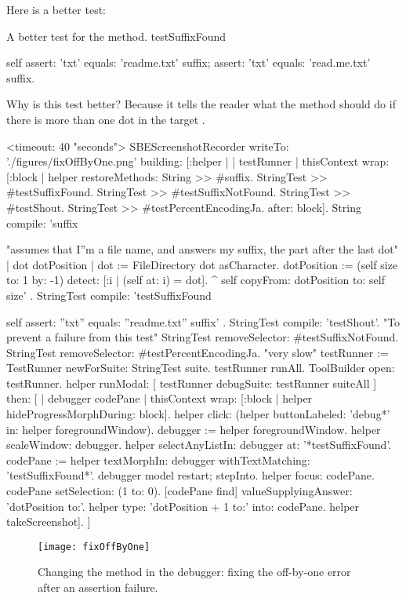 \documentclass[a4paper,10pt,twoside]{book}
\begin{document}
Here is a better test:

\begin{method}[testSuffix2]{A better test for the  method.}
testSuffixFound

	self
		assert: 'txt' equals: 'readme.txt' suffix;
		assert: 'txt' equals: 'read.me.txt' suffix.
\end{method}
\noindent
Why is this test better?
Because it tells the reader what the method should do if there is more than one dot in the target .


\begin{ExecuteSmalltalkScript}
<timeout: 40 "seconds">
SBEScreenshotRecorder writeTo: './figures/fixOffByOne.png' building: [:helper |
	| testRunner |
	thisContext wrap: [:block | helper restoreMethods: {
			String >> #suffix.
			StringTest >> #testSuffixFound.
			StringTest >> #testSuffixNotFound.
			StringTest >> #testShout.
			StringTest >> #testPercentEncodingJa. }
		after: block].
	String compile: 'suffix

"assumes that I''m a file name, and answers my suffix, the part after the last dot"
| dot dotPosition |
dot := FileDirectory dot asCharacter.
dotPosition := (self size to: 1 by: -1) detect: [:i | (self at: i) = dot].
^ self copyFrom: dotPosition to: self size'
.
	StringTest compile: 'testSuffixFound

self assert: ''txt'' equals: ''readme.txt'' suffix'
.
	StringTest compile: 'testShout'. "To prevent a failure from this test"
	StringTest removeSelector: #testSuffixNotFound.
	StringTest removeSelector: #testPercentEncodingJa. "very slow"
	testRunner := TestRunner newForSuite: StringTest suite.
	testRunner runAll.
	ToolBuilder open: testRunner.
	helper
		runModal: [ testRunner debugSuite: testRunner suiteAll ]
		then: [
			| debugger codePane |
			thisContext wrap: [:block | helper hideProgressMorphDuring: block].
			helper click: (helper buttonLabeled: 'debug*' in: helper foregroundWindow).
			debugger := helper foregroundWindow.
			helper scaleWindow: debugger.
			helper selectAnyListIn: debugger at: '*testSuffixFound'.
			codePane := helper textMorphIn: debugger withTextMatching: 'testSuffixFound*'.
			debugger model restart; stepInto.
			helper focus: codePane.
			codePane setSelection: (1 to: 0).
			[codePane find]
				valueSupplyingAnswer: 'dotPosition to:'.
			helper type: 'dotPosition + 1 to:' into: codePane.
			helper takeScreenshot].
]
\end{ExecuteSmalltalkScript}
\begin{figure}[btp]
	\begin{center}
		\texttt{[image: fixOffByOne]}
	\end{center}
	\caption{Changing the  method in the debugger: fixing the off-by-one error after an \sunit assertion failure.}
	\label{fig:fixOffByOne}
\end{figure}
\end{document}
